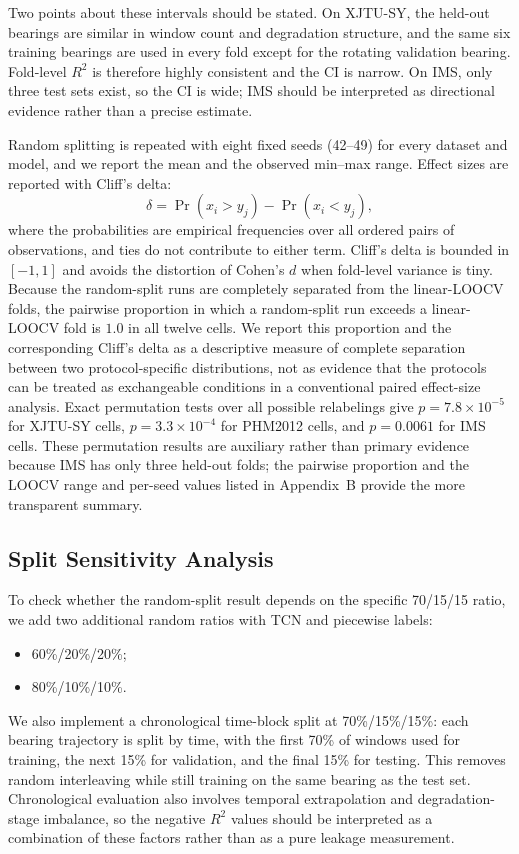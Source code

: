\documentclass[pdflatex,sn-mathphys-num]{sn-jnl}
\begin{document}
Two points about these intervals should be stated. On XJTU-SY, the held-out bearings are similar in window count and degradation structure, and the same six training bearings are used in every fold except for the rotating validation bearing. Fold-level $R^2$ is therefore highly consistent and the CI is narrow. On IMS, only three test sets exist, so the CI is wide; IMS should be interpreted as directional evidence rather than a precise estimate.

Random splitting is repeated with eight fixed seeds (42--49) for every dataset and model, and we report the mean and the observed min--max range. Effect sizes are reported with Cliff's delta:
\begin{equation}
\delta = \Pr(x_i > y_j) - \Pr(x_i < y_j),
\label{eq:cliff}
\end{equation}
where the probabilities are empirical frequencies over all ordered pairs of observations, and ties do not contribute to either term. Cliff's delta is bounded in $[-1, 1]$ and avoids the distortion of Cohen's $d$ when fold-level variance is tiny. Because the random-split runs are completely separated from the linear-LOOCV folds, the pairwise proportion in which a random-split run exceeds a linear-LOOCV fold is $1.0$ in all twelve cells. We report this proportion and the corresponding Cliff's delta as a descriptive measure of complete separation between two protocol-specific distributions, not as evidence that the protocols can be treated as exchangeable conditions in a conventional paired effect-size analysis. Exact permutation tests over all possible relabelings give $p=7.8\times10^{-5}$ for XJTU-SY cells, $p=3.3\times10^{-4}$ for PHM2012 cells, and $p=0.0061$ for IMS cells. These permutation results are auxiliary rather than primary evidence because IMS has only three held-out folds; the pairwise proportion and the LOOCV range and per-seed values listed in Appendix~B provide the more transparent summary.

\subsection{Split Sensitivity Analysis}
To check whether the random-split result depends on the specific 70/15/15 ratio, we add two additional random ratios with TCN and piecewise labels:
\begin{itemize}
    \item 60\%/20\%/20\%;
    \item 80\%/10\%/10\%.
\end{itemize}
We also implement a chronological time-block split at 70\%/15\%/15\%: each bearing trajectory is split by time, with the first 70\% of windows used for training, the next 15\% for validation, and the final 15\% for testing. This removes random interleaving while still training on the same bearing as the test set. Chronological evaluation also involves temporal extrapolation and degradation-stage imbalance, so the negative $R^2$ values should be interpreted as a combination of these factors rather than as a pure leakage measurement.
\end{document}
